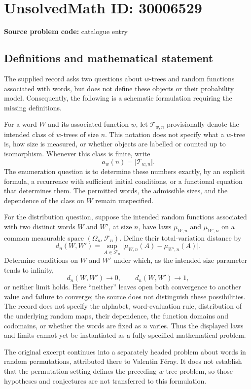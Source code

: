 \documentclass[11pt]{article}
\begin{document}
\section*{UnsolvedMath ID: 30006529}
\textbf{Source problem code:} catalogue entry
\subsection{Definitions and mathematical statement}
The supplied record asks two questions about \(w\)-trees and random functions associated with words, but does not define these objects or their probability model. Consequently, the following is a schematic formulation requiring the missing definitions.

For a word \(W\) and its associated function \(w\), let \(\mathcal T_{w,n}\) provisionally denote the intended class of \(w\)-trees of size \(n\). This notation does not specify what a \(w\)-tree is, how size is measured, or whether objects are labelled or counted up to isomorphism. Whenever this class is finite, write
\[
 a_w(n)=\lvert\mathcal T_{w,n}\rvert.
\]
The enumeration question is to determine these numbers exactly, by an explicit formula, a recurrence with sufficient initial conditions, or a functional equation that determines them. The permitted words, the admissible sizes, and the dependence of the class on \(W\) remain unspecified.

For the distribution question, suppose the intended random functions associated with two distinct words \(W\) and \(W'\), at size \(n\), have laws \(\mu_{W,n}\) and \(\mu_{W',n}\) on a common measurable space \((\Omega_n,\mathcal F_n)\). Define their total-variation distance by
\[
 d_n(W,W')=\sup_{A\in\mathcal F_n}
 \bigl|\mu_{W,n}(A)-\mu_{W',n}(A)\bigr|.
\]
Determine conditions on \(W\) and \(W'\) under which, as the intended size parameter tends to infinity,
\[
 d_n(W,W')\longrightarrow 0,
 \qquad
 d_n(W,W')\longrightarrow 1,
\]
or neither limit holds. Here ``neither'' leaves open both convergence to another value and failure to converge; the source does not distinguish these possibilities. The record does not specify the alphabet, word-evaluation rule, distribution of the underlying random maps, their dependence, the function domains and codomains, or whether the words are fixed as \(n\) varies. Thus the displayed laws and limits cannot yet be instantiated as a fully specified mathematical problem.

The original excerpt continues into a separately headed problem about words in random permutations, attributed there to Valentin F\'eray. It does not establish that the permutation setting defines the preceding \(w\)-tree problem, so those hypotheses and conjectures are not transferred to this formulation.
\end{document}

